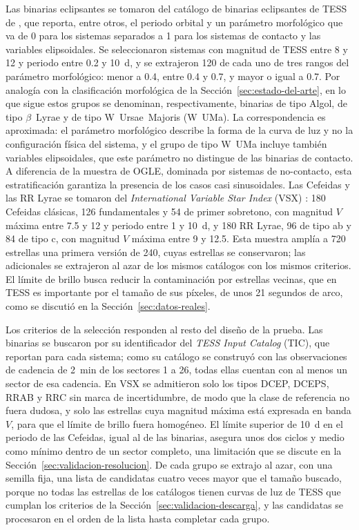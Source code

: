 \documentclass[12pt,letterpaper,oneside]{book}
\begin{document}
Las binarias eclipsantes se tomaron del cat\'alogo de binarias eclipsantes de TESS de \citet{Prsa2022}, que reporta, entre otros, el periodo orbital y un par\'ametro morfol\'ogico que va de 0 para los sistemas separados a 1 para los sistemas de contacto y las variables elipsoidales. Se seleccionaron sistemas con magnitud de TESS entre 8 y 12 y periodo entre 0.2 y 10~d, y se extrajeron 120 de cada uno de tres rangos del par\'ametro morfol\'ogico: menor a 0.4, entre 0.4 y 0.7, y mayor o igual a 0.7. Por analog\'ia con la clasificaci\'on morfol\'ogica de la Secci\'on~\ref{sec:estado-del-arte}, en lo que sigue estos grupos se denominan, respectivamente, binarias de tipo Algol, de tipo $\beta$~Lyrae y de tipo W~Ursae~Majoris (W~UMa). La correspondencia es aproximada: el par\'ametro morfol\'ogico describe la forma de la curva de luz y no la configuraci\'on f\'isica del sistema, y el grupo de tipo W~UMa incluye tambi\'en variables elipsoidales, que este par\'ametro no distingue de las binarias de contacto. A diferencia de la muestra de OGLE, dominada por sistemas de no-contacto, esta estratificaci\'on garantiza la presencia de los casos casi sinusoidales. Las Cefeidas y las RR Lyrae se tomaron del \emph{International Variable Star Index} (VSX) \citep{Watson2006}: 180 Cefeidas cl\'asicas, 126 fundamentales y 54 de primer sobretono, con magnitud $V$ m\'axima entre 7.5 y 12 y periodo entre 1 y 10~d, y 180 RR Lyrae, 96 de tipo ab y 84 de tipo c, con magnitud $V$ m\'axima entre 9 y 12.5. Esta muestra ampl\'ia a 720 estrellas una primera versi\'on de 240, cuyas estrellas se conservaron; las adicionales se extrajeron al azar de los mismos cat\'alogos con los mismos criterios. El l\'imite de brillo busca reducir la contaminaci\'on por estrellas vecinas, que en TESS es importante por el tama\~no de sus p\'ixeles, de unos 21 segundos de arco, como se discuti\'o en la Secci\'on~\ref{sec:datos-reales}.

Los criterios de la selecci\'on responden al resto del dise\~no de la prueba. Las binarias se buscaron por su identificador del \emph{TESS Input Catalog} (TIC), que \citet{Prsa2022} reportan para cada sistema; como su cat\'alogo se construy\'o con las observaciones de cadencia de 2~min de los sectores 1 a 26, todas ellas cuentan con al menos un sector de esa cadencia. En VSX se admitieron solo los tipos DCEP, DCEPS, RRAB y RRC sin marca de incertidumbre, de modo que la clase de referencia no fuera dudosa, y solo las estrellas cuya magnitud m\'axima est\'a expresada en banda $V$, para que el l\'imite de brillo fuera homog\'eneo. El l\'imite superior de 10~d en el periodo de las Cefeidas, igual al de las binarias, asegura unos dos ciclos y medio como m\'inimo dentro de un sector completo, una limitaci\'on que se discute en la Secci\'on~\ref{sec:validacion-resolucion}. De cada grupo se extrajo al azar, con una semilla fija, una lista de candidatas cuatro veces mayor que el tama\~no buscado, porque no todas las estrellas de los cat\'alogos tienen curvas de luz de TESS que cumplan los criterios de la Secci\'on~\ref{sec:validacion-descarga}, y las candidatas se procesaron en el orden de la lista hasta completar cada grupo.
\end{document}

